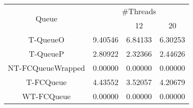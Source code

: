 \begin{tabular}{|c|c|c|c|}
\hline
\multirow{2}{*}{Queue} & \multicolumn{3}{c|}{\#Threads}\\\cline{2-4}& \quad 4 & 12 & 20\\
\hline
\hline
T-QueueO & 9.40546 & 6.84133 & 6.30253\\
T-QueueP & 2.80922 & 2.32366 & 2.44626\\
NT-FCQueueWrapped & 0.00000 & 0.00000 & 0.00000\\
T-FCQueue & 4.43552 & 3.52057 & 4.20679\\
WT-FCQueue & 0.00000 & 0.00000 & 0.00000\\
\hline\end{tabular}

